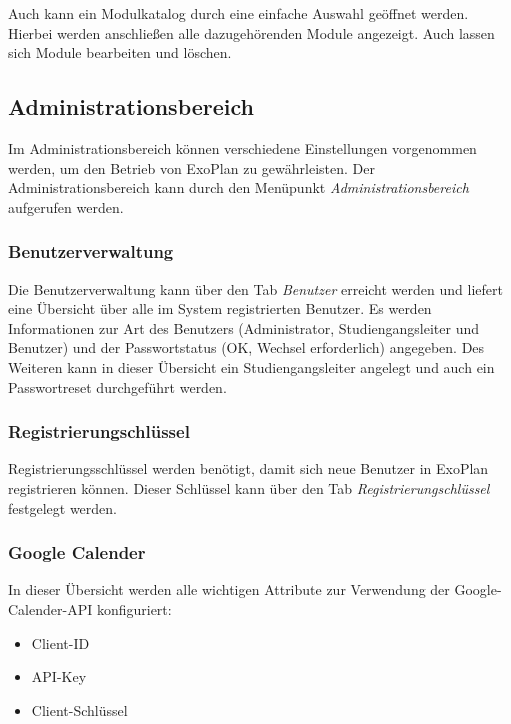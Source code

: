 Auch kann ein Modulkatalog durch eine einfache Auswahl geöffnet werden. Hierbei werden anschließen alle dazugehörenden Module angezeigt. Auch lassen sich Module bearbeiten und löschen.

\subsection{Administrationsbereich}

Im Administrationsbereich können verschiedene Einstellungen vorgenommen werden, um den Betrieb von ExoPlan zu gewährleisten. Der Administrationsbereich kann durch den Menüpunkt \textit{Administrationsbereich} aufgerufen werden.

\subsubsection{Benutzerverwaltung}

Die Benutzerverwaltung kann über den Tab \textit{Benutzer} erreicht werden und liefert eine Übersicht über alle im System registrierten Benutzer. Es werden Informationen zur Art des Benutzers (Administrator, Studiengangsleiter und Benutzer) und der Passwortstatus (OK, Wechsel erforderlich) angegeben. Des Weiteren kann in dieser Übersicht ein Studiengangsleiter angelegt und auch ein Passwortreset durchgeführt werden.

\subsubsection{Registrierungschlüssel}

Registrierungsschlüssel werden benötigt, damit sich neue Benutzer in ExoPlan registrieren können. Dieser Schlüssel kann über den Tab \textit{Registrierungschlüssel} festgelegt werden.

\subsubsection{Google Calender}

In dieser Übersicht werden alle wichtigen Attribute zur Verwendung der Google-Calender-API konfiguriert:
\begin{itemize}
	\item Client-ID
	\item API-Key
	\item Client-Schlüssel
\end{itemize}
